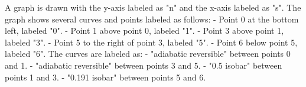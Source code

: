A graph is drawn with the y-axis labeled as "n" and the x-axis labeled as "s". The graph shows several curves and points labeled as follows:  
- Point 0 at the bottom left, labeled "0".  
- Point 1 above point 0, labeled "1".  
- Point 3 above point 1, labeled "3".  
- Point 5 to the right of point 3, labeled "5".  
- Point 6 below point 5, labeled "6".  
The curves are labeled as:  
- "adiabatic reversible" between points 0 and 1.  
- "adiabatic reversible" between points 3 and 5.  
- "0.5 isobar" between points 1 and 3.  
- "0.191 isobar" between points 5 and 6.